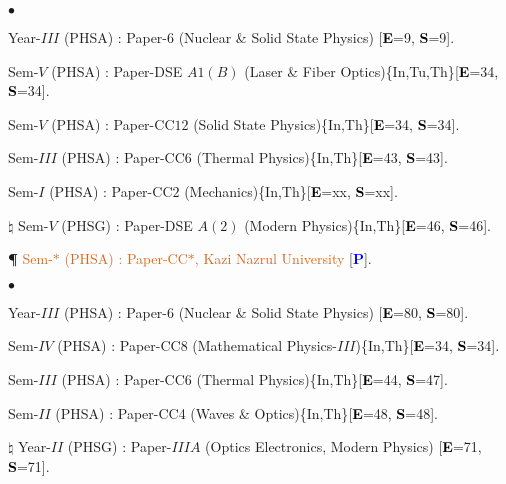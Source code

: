 \documentclass[margin,line]{res}
\newenvironment{list1}{
  \begin{list}{\ding{113}}{%
      \setlength{\itemsep}{0in}
      \setlength{\parsep}{0in} \setlength{\parskip}{0in}
      \setlength{\topsep}{0in} \setlength{\partopsep}{0in} 
      \setlength{\leftmargin}{0.17in}}}{\end{list}}
\newenvironment{list2}{
  \begin{list}{$\bullet$}{%
      \setlength{\itemsep}{0in}
      \setlength{\parsep}{0in} \setlength{\parskip}{0in}
      \setlength{\topsep}{0in} \setlength{\partopsep}{0in} 
      \setlength{\leftmargin}{0.2in}}}{\end{list}}
\begin{document}
\begin{resume}
\begin{list2}
\item Year-$III$ (PHSA) : Paper-6 (Nuclear \& Solid State Physics) [\textcolor{black}{\bf E}=9, \textcolor{black}{\bf S}=9]. 
\item Sem-$V$ (PHSA) : Paper-DSE $A1(B)$ (Laser \& Fiber Optics)\textcolor{alizarin}{\{In,Tu,Th\}}[\textcolor{black}{\bf E}=34, \textcolor{black}{\bf S}=34]. 
\item Sem-$V$ (PHSA) : Paper-CC$12$ (Solid State Physics)\textcolor{alizarin}{\{In,Th\}}[\textcolor{black}{\bf E}=34, \textcolor{black}{\bf S}=34]. 
\item Sem-$III$ (PHSA) : Paper-CC6 (Thermal Physics)\textcolor{alizarin}{\{In,Th\}}[\textcolor{black}{\bf E}=43, \textcolor{black}{\bf S}=43]. 
\item Sem-$I$ (PHSA) : Paper-CC$2$ (Mechanics)\textcolor{alizarin}{\{In,Th\}}[\textcolor{black}{\bf E}=xx, \textcolor{black}{\bf S}=xx]. 
\item[$\pmb{\natural}$] Sem-$V$ (PHSG) : Paper-DSE $A(2)$ (Modern Physics)\textcolor{alizarin}{\{In,Th\}}[\textcolor{black}{\bf E}=46, \textcolor{black}{\bf S}=46].
\item[{\bf \P}] \textcolor{chocolate}{Sem-$*$ (PHSA) : Paper-CC$*$, Kazi Nazrul University} [\textcolor{blue}{\bf P}]. 
\end{list2}
\begin{list1}
\item[] \textcolor{iris}{}
\vspace{1mm}
\end{list1}
\begin{list2}
\item Year-$III$ (PHSA) : Paper-6 (Nuclear \& Solid State Physics) [\textcolor{black}{\bf E}=80, \textcolor{black}{\bf S}=80]. 
\item Sem-$IV$ (PHSA) : Paper-CC8 (Mathematical Physics-$III$)\textcolor{alizarin}{\{In,Th\}}[\textcolor{black}{\bf E}=34, \textcolor{black}{\bf S}=34]. 
\item Sem-$III$ (PHSA) : Paper-CC6 (Thermal Physics)\textcolor{alizarin}{\{In,Th\}}[\textcolor{black}{\bf E}=44, \textcolor{black}{\bf S}=47]. 
\item Sem-$II$ (PHSA) : Paper-CC4 (Waves \& Optics)\textcolor{alizarin}{\{In,Th\}}[\textcolor{black}{\bf E}=48, \textcolor{black}{\bf S}=48]. 
\item[$\pmb{\natural}$] Year-$II$ (PHSG) : Paper-$IIIA$ (Optics Electronics, Modern Physics) [\textcolor{black}{\bf E}=71, \textcolor{black}{\bf S}=71]. 
\end{list2}

\end{resume}
\end{document}
